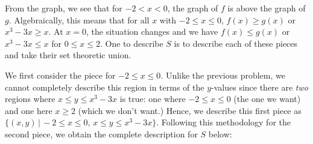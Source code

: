 \documentclass{ximera}
\begin{document}
\begin{example}
\begin{explanation}
\begin{enumerate}
\begin{enumerate}
\begin{image}
\end{image}

From the graph, we see that for $-2 < x < 0$,  the graph of $f$ is above the graph of $g$.  Algebraically, this means that for all $x$ with $-2 \leq x \leq 0$, $f(x) \geq g(x)$ or $x^3-3x \geq x$.  At $x=0$, the situation changes and we have $f(x) \leq g(x)$ or $x^3-3x \leq x$ for $0 \leq x \leq 2$.  One to describe $S$ is to describe each of these pieces and take their set theoretic union. 

We first consider the piece for $-2 \leq x \leq 0$. Unlike the previous problem, we cannot completely describe this region in terms of the $y$-values since there are \textit{two} regions where $x \leq y \leq x^3-3x$ is true:  one where $-2 \leq x \leq 0$ (the one we want) and one here $x \geq 2$ (which we don't want.) Hence, we describe this first piece as $ \{ (x,y) \, | \, -2 \leq x \leq 0, \, x \leq y \leq x^3-3x \}$.  Following this methodology for the second piece, we obtain the complete description for $S$ below: 


\end{enumerate}
\end{enumerate}
\end{explanation}
\end{example}
\end{document}
